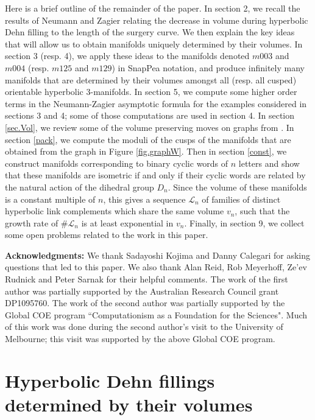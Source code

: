 \documentclass[reqno]{amsproc}  %
\begin{document}
\medskip
Here is a brief outline of the remainder of the paper.  
In section 2, we recall the results of Neumann and Zagier relating the decrease in volume during 
hyperbolic Dehn filling to the length of the surgery curve. We then explain the key ideas that
will allow us to obtain manifolds uniquely determined by their volumes. 
In section 3 (resp. 4), we apply these ideas to the manifolds denoted $m003$ and $m004$ (resp. $m125$ and $m129$) in
SnapPea notation, and produce infinitely many manifolds that are determined by their volumes
amongst all (resp. all cusped) orientable hyperbolic 3-manifolds.
In section 5, we compute some higher order terms in  the Neumann-Zagier
asymptotic formula for the examples considered in sections 3 and 4;
some of those computations are used in section 4.
In section \ref{sec.Vol}, we review some of the volume preserving moves on graphs from \cite{Mas}. 
In section \ref{pack}, we compute the moduli of the cusps of the manifolds that are obtained 
from the graph in Figure \ref{fig.graphW}. 
Then in section \ref{const}, we construct manifolds corresponding to binary cyclic words of $n$ letters and show that 
these manifolds are isometric if and only if their cyclic words are related by the natural action of the dihedral group $D_n$. 
Since the volume of these manifolds is a constant multiple of $n$, 
this gives a sequence $\mathcal{L}_n$ of families of distinct hyperbolic link complements which share the same 
volume $v_n$, such that the growth rate of $\#\mathcal{L}_n$ is at least exponential in $v_n$.
Finally,  in section 9, we collect some open problems related to the work in this paper.

\medskip\noindent
{\bf Acknowledgments:}
We thank Sadayoshi Kojima and Danny Calegari for asking questions that led to this paper.
We also thank Alan Reid,  Rob Meyerhoff, Ze'ev Rudnick  and Peter Sarnak for their helpful comments.
The work of the first author was partially supported by the Australian Research Council grant DP1095760.
The work of the second author was partially supported by the Global COE program
 ``Computationism as a Foundation for the Sciences".
Much of this work was done during the second author's visit to the University of Melbourne; this visit was supported by the above Global COE program. 


\section{Hyperbolic Dehn fillings determined by their volumes}\label{cusped_hyp}
\end{document}
